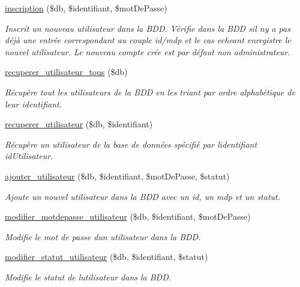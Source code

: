 \begin{DoxyCompactItemize}
\hyperlink{fonctionCompte_8php_a14a1d917e57b5e0bbbded23ed82df0a3}{inscription} (\$db, \$identifiant, \$mot\+De\+Passe)
\begin{DoxyCompactList}\small\item\em Inscrit un nouveau utilisateur dans la B\+DD. Vérifie dans la B\+DD s\textquotesingle{}il n\textquotesingle{}y a pas déjà une entrée correspondant au couple id/mdp et le cas echeant enregistre le nouvel utilisateur. Le nouveau compte crée est par défaut non administrateur. \end{DoxyCompactList}\item 
\hyperlink{fonctionCompte_8php_aadbf0b64bdc685cdf00ccc9a7ee666ad}{recuperer\+\_\+utilisateur\+\_\+tous} (\$db)
\begin{DoxyCompactList}\small\item\em Récupère tout les utilisateurs de la B\+DD en les triant par ordre alphabétique de leur identifiant. \end{DoxyCompactList}\item 
\hyperlink{fonctionCompte_8php_a965b084282293c3d3a9816a413fd5f4c}{recuperer\+\_\+utilisateur} (\$db, \$identifiant)
\begin{DoxyCompactList}\small\item\em Récupère un utilisateur de la base de données spécifié par l\textquotesingle{}identifiant \textquotesingle{}id\+Utilisateur\textquotesingle{}. \end{DoxyCompactList}\item 
\hyperlink{fonctionCompte_8php_aa50c1cf48630472e499d09a15230e8f1}{ajouter\+\_\+utilisateur} (\$db, \$identifiant, \$mot\+De\+Passe, \$statut)
\begin{DoxyCompactList}\small\item\em Ajoute un nouvel utilisateur dans la B\+DD avec un id, un mdp et un statut. \end{DoxyCompactList}\item 
\hyperlink{fonctionCompte_8php_a0d73aace23ae62538ab0ac26ade08960}{modifier\+\_\+motdepasse\+\_\+utilisateur} (\$db, \$identifiant, \$mot\+De\+Passe)
\begin{DoxyCompactList}\small\item\em Modifie le mot de passe d\textquotesingle{}un utilisateur dans la B\+DD. \end{DoxyCompactList}\item 
\hyperlink{fonctionCompte_8php_a355bff11e2418b867d8f9ad50e51af90}{modifier\+\_\+statut\+\_\+utilisateur} (\$db, \$identifiant, \$statut)
\begin{DoxyCompactList}\small\item\em Modifie le statut de l\textquotesingle{}utilisateur dans la B\+DD. \end{DoxyCompactList}\item 

\end{DoxyCompactItemize}
